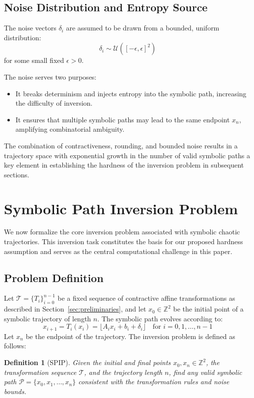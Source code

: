 \documentclass[twocolumn,10pt]{article}
\newtheorem{definition}{Definition}
\begin{document}
\subsection{Noise Distribution and Entropy Source}
The noise vectors $\delta_i$ are assumed to be drawn from a bounded, uniform distribution:
\[
\delta_i \sim \mathcal{U}([-\epsilon, \epsilon]^2)
\]
for some small fixed $\epsilon > 0$.

The noise serves two purposes:
\begin{itemize}
    \item It breaks determinism and injects entropy into the symbolic path, increasing the difficulty of inversion.
    \item It ensures that multiple symbolic paths may lead to the same endpoint $x_n$, amplifying combinatorial ambiguity.
\end{itemize}

The combination of contractiveness, rounding, and bounded noise results in a trajectory space with exponential growth in the number of valid symbolic paths a key element in establishing the hardness of the inversion problem in subsequent sections.

\section{Symbolic Path Inversion Problem} \label{sec:spip}
\vspace{0.8em}

We now formalize the core inversion problem associated with symbolic chaotic trajectories. This inversion task constitutes the basis for our proposed hardness assumption and serves as the central computational challenge in this paper.

\subsection{Problem Definition}

Let $\mathcal{T} = \{T_i\}_{i=0}^{n-1}$ be a fixed sequence of contractive affine transformations as described in Section~\ref{sec:preliminaries}, and let $x_0 \in \mathbb{Z}^2$ be the initial point of a symbolic trajectory of length $n$. The symbolic path evolves according to:
\[
x_{i+1} = T_i(x_i) = \lfloor A_i x_i + b_i + \delta_i \rfloor
\quad \text{for } i = 0, 1, \dots, n-1
\]
Let $x_n$ be the endpoint of the trajectory. The inversion problem is defined as follows:

\begin{definition}[SPIP]
Given the initial and final points $x_0, x_n \in \mathbb{Z}^2$, the transformation sequence $\mathcal{T}$, and the trajectory length $n$, find any valid symbolic path $\mathcal{P} = \{x_0, x_1, \dots, x_n\}$ consistent with the transformation rules and noise bounds.
\end{definition}
\end{document}
